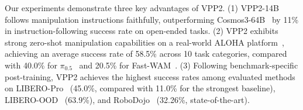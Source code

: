 Our experiments demonstrate three key advantages of VPP2. (1) VPP2-14B follows manipulation instructions faithfully, outperforming Cosmos3-64B~\citep{agarwal2026cosmos} by 11\% in instruction-following success rate on open-ended tasks. (2) VPP2 exhibits strong zero-shot manipulation capabilities on a real-world ALOHA platform~\citep{zhao2023learning}, achieving an average success rate of 58.5\% across 10 task categories, compared with 40.0\% for $\pi_{0.5}$~\citep{intelligence2025pi_} and 20.5\% for Fast-WAM~\citep{yuan2026fastwam}. (3) Following benchmark-specific post-training, VPP2 achieves the highest success rates among evaluated methods on LIBERO-Pro~\citep{zhou2025liberopro} (45.0\%, compared with 11.0\% for the strongest baseline), LIBERO-OOD~\citep{li2025vlas,mishra2026understanding} (63.9\%), and RoboDojo~\citep{chen2026robodojo} (32.26\%, state-of-the-art).





